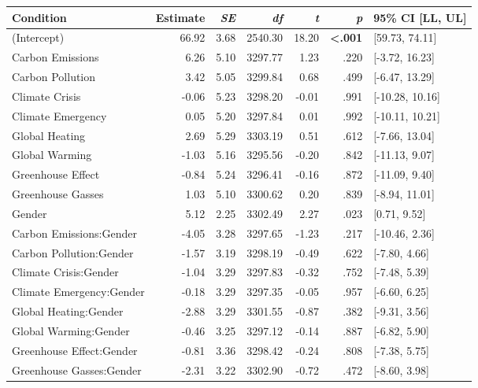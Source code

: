 \begin{table}[ht]
\centering
\begin{tabular}{lrrrrrl}
  \hline
Condition & Estimate & \textit{SE} & \textit{df} & \textit{t} & \textit{p} & 95\% CI [LL, UL] \\ 
  \hline
(Intercept) & 66.92 & 3.68 & 2540.30 & 18.20 & \textbf{\textless  .001} & [59.73, 74.11] \\ 
  Carbon Emissions & 6.26 & 5.10 & 3297.77 & 1.23 & .220 & [-3.72, 16.23] \\ 
  Carbon Pollution & 3.42 & 5.05 & 3299.84 & 0.68 & .499 & [-6.47, 13.29] \\ 
  Climate Crisis & -0.06 & 5.23 & 3298.20 & -0.01 & .991 & [-10.28, 10.16] \\ 
  Climate Emergency & 0.05 & 5.20 & 3297.84 & 0.01 & .992 & [-10.11, 10.21] \\ 
  Global Heating & 2.69 & 5.29 & 3303.19 & 0.51 & .612 & [-7.66, 13.04] \\ 
  Global Warming & -1.03 & 5.16 & 3295.56 & -0.20 & .842 & [-11.13, 9.07] \\ 
  Greenhouse Effect & -0.84 & 5.24 & 3296.41 & -0.16 & .872 & [-11.09, 9.40] \\ 
  Greenhouse Gasses & 1.03 & 5.10 & 3300.62 & 0.20 & .839 & [-8.94, 11.01] \\ 
  Gender & 5.12 & 2.25 & 3302.49 & 2.27 & .023 & [0.71, 9.52] \\ 
  Carbon Emissions:Gender & -4.05 & 3.28 & 3297.65 & -1.23 & .217 & [-10.46, 2.36] \\ 
  Carbon Pollution:Gender & -1.57 & 3.19 & 3298.19 & -0.49 & .622 & [-7.80, 4.66] \\ 
  Climate Crisis:Gender & -1.04 & 3.29 & 3297.83 & -0.32 & .752 & [-7.48, 5.39] \\ 
  Climate Emergency:Gender & -0.18 & 3.29 & 3297.35 & -0.05 & .957 & [-6.60, 6.25] \\ 
  Global Heating:Gender & -2.88 & 3.29 & 3301.55 & -0.87 & .382 & [-9.31, 3.56] \\ 
  Global Warming:Gender & -0.46 & 3.25 & 3297.12 & -0.14 & .887 & [-6.82, 5.90] \\ 
  Greenhouse Effect:Gender & -0.81 & 3.36 & 3298.42 & -0.24 & .808 & [-7.38, 5.75] \\ 
  Greenhouse Gasses:Gender & -2.31 & 3.22 & 3302.90 & -0.72 & .472 & [-8.60, 3.98] \\ 
   \hline
\end{tabular}
\end{table}
